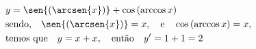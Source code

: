 \begin{ex}
\begin{align}
&y=\sen{(\arcsen{x})}+\cos{(\arccos{x})}\nonumber\\
&\text{sendo,}\quad \sen{(\arcsen{x})}=x,\quad\text{e}\quad \cos{(\arccos{x})}=x,\nonumber\\
&\text{temos que}\quad y=x+x,\quad \text{então} \quad y'=1+1=2\nonumber
\end{align}
\end{ex}